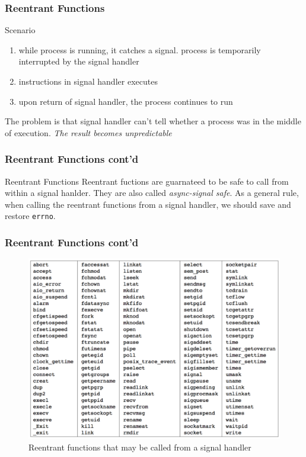 \documentclass[newPxFont,sthlmFooter,nooffset]{beamer}
\begin{document}
\begin{frame}[fragile,t]
  \frametitle{Reentrant Functions}

Scenario
\begin{enumerate}
\item <1-> while process is running, it catches a signal. process is temporarily interrupted by the signal handler
\item <2-> instructions in signal handler executes
\item <3-> upon return of signal handler, the process continues to run
\end{enumerate}

 {The problem is that signal handler can't tell whether a process was in the middle of execution. \textit{The result becomes unpredictable}}
\end{frame}


\begin{frame}[fragile]
  \frametitle{Reentrant Functions cont'd}
\begin{block}{Reentrant Functions}
Reentrant fuctions are guarnateed to be safe to call from within a signal hanlder.   They are also called \textit{async-signal safe}. As a general rule, when calling the reentrant  functions from a signal handler, we should save and restore \texttt{errno}.
\end{block}
\end{frame}

\begin{frame}
  \frametitle{Reentrant Functions cont'd}
  \begin{figure}[h]
    \centering
    \includegraphics[height=0.87\textheight]{figure/fig10-4_reentrant.png}
    \caption{Reentrant functions that may be called from a signal handler}
  \end{figure}
\end{frame}
\end{document}
